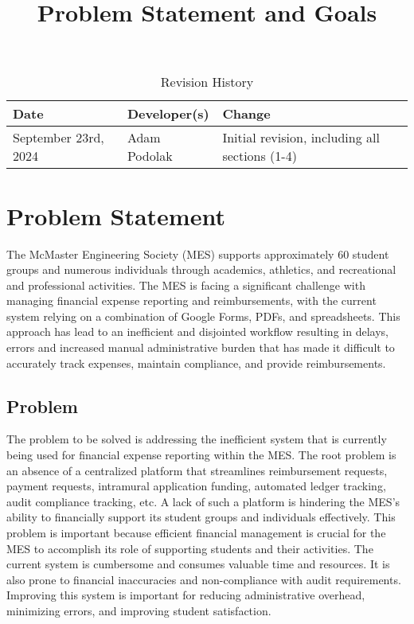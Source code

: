 \documentclass{article}
\title{Problem Statement and Goals\\\progname}
\author{\authname}
\date{}
\begin{document}
\maketitle

\begin{table}[hp]
\caption{Revision History} \label{TblRevisionHistory}
\begin{tabularx}{\textwidth}{llX}
\toprule
\textbf{Date} & \textbf{Developer(s)} & \textbf{Change}\\
\midrule
September 23rd, 2024 & Adam Podolak & Initial revision, including all sections (1-4)\\
\bottomrule
\end{tabularx}
\end{table}

\section{Problem Statement}



The McMaster Engineering Society (MES) supports approximately 60 student groups and numerous individuals through academics, athletics, and recreational and professional activities. The MES is facing a significant challenge with managing financial expense reporting and reimbursements, with the current system relying on a combination of Google Forms, PDFs, and spreadsheets. This approach has lead to an inefficient and disjointed workflow resulting in delays, errors and increased manual administrative burden that has made it difficult to accurately track expenses, maintain compliance, and provide reimbursements. 

\subsection{Problem}

The problem to be solved is addressing the inefficient system that is currently being used for financial expense reporting within the MES. The root problem is an absence of a centralized platform that streamlines reimbursement requests, payment requests, intramural application funding, automated ledger tracking, audit compliance tracking, etc. A lack of such a platform is hindering the MES's ability to financially support its student groups and individuals effectively. This problem is important because efficient financial management is crucial for the MES to accomplish its role of supporting students and their activities. The current system is cumbersome and consumes valuable time and resources. It is also prone to financial inaccuracies and non-compliance with audit requirements. Improving this system is important for reducing administrative overhead, minimizing errors, and improving student satisfaction.
\end{document}
